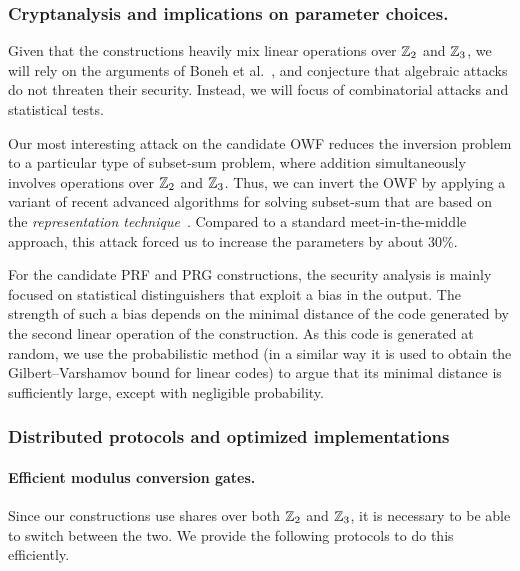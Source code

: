 \subsubsection{Cryptanalysis and implications on parameter choices.}
Given that the constructions heavily mix linear operations over $\mathbb{Z}_2$ and $\mathbb{Z}_3$, 
we will rely on the arguments of Boneh et al.~\cite{boneh2018-darkmatter}, 
and conjecture that algebraic attacks do not threaten their security.
Instead, we will focus of combinatorial attacks and statistical tests.

Our most interesting attack on the 
candidate OWF reduces the inversion problem to a particular type of subset-sum problem,
where addition simultaneously involves operations over $\mathbb{Z}_2$ and $\mathbb{Z}_3$.
Thus, we can invert the OWF by applying a variant of recent advanced algorithms
for solving subset-sum that are based on the 
\emph{representation technique}~\cite{Howgrave-GrahamJ10,BeckerCJ11,BonnetainBSS20}.
Compared to a standard meet-in-the-middle approach, 
this attack forced us to increase the parameters by about $30\%$.

For the candidate PRF and PRG constructions, 
the security analysis is mainly focused on
statistical distinguishers that exploit a bias in the output.
The strength of such a bias depends on the minimal distance of the 
code generated by the second linear operation of the construction.
As this code is generated at random, we use the probabilistic method
(in a similar way it is used to obtain the Gilbert–Varshamov bound for linear codes) 
to argue that its minimal distance is sufficiently large, except with negligible probability. 


\subsubsection{Distributed protocols and optimized implementations}
 
\paragraph{Efficient modulus conversion gates.}
Since our constructions use shares over both $\mathbb{Z}_2$ and $\mathbb{Z}_3$, it is necessary to be able to switch between the two. We provide the following protocols to do this efficiently. 

